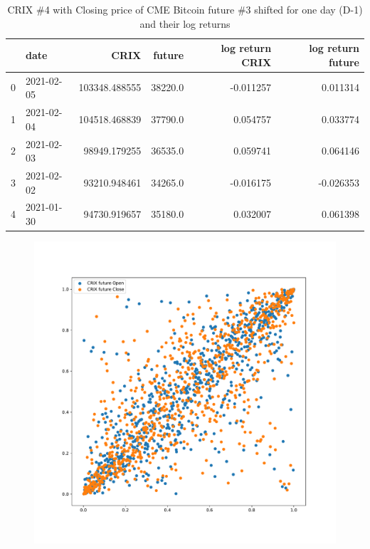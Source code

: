 \begin{table}[h]
\begin{tabular}{llrrrr}
\toprule
{} &                      date &           CRIX &   future &  log return CRIX &  log return future \\
\midrule
0 & 2021-02-05  &  103348.488555 &  38220.0 &        -0.011257 &           0.011314 \\
1 & 2021-02-04  &  104518.468839 &  37790.0 &         0.054757 &           0.033774 \\
2 & 2021-02-03  &   98949.179255 &  36535.0 &         0.059741 &           0.064146 \\
3 & 2021-02-02  &   93210.948461 &  34265.0 &        -0.016175 &          -0.026353 \\
4 & 2021-01-30  &   94730.919657 &  35180.0 &         0.032007 &           0.061398 \\
\bottomrule
\end{tabular}
    \caption{CRIX \#4 with Closing price of CME Bitcoin future \#3 shifted for one day (D-1) and their log returns}
    \label{tab:table3}
\end{table}

\clearpage
\begin{figure}[ht]
    \centering
    \includegraphics[scale=.35]{_pics_notes/CRIX_future_Open_Close.pdf}
    \end{figure}

